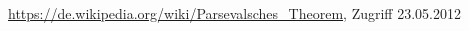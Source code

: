 

\begin{thebibliography}{999}

 \url{https://de.wikipedia.org/wiki/Parsevalsches_Theorem}, Zugriff
23.05.2012
\end{thebibliography}





